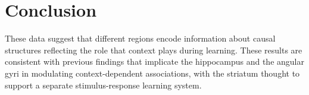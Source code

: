 \documentclass[10pt,letterpaper]{article}
\begin{document}
\section{Conclusion}

These data suggest that different regions encode information about causal structures reflecting the role that context plays during learning. These results are consistent with previous findings that implicate the hippocampus and the angular gyri in modulating context-dependent associations, with the striatum thought to support a separate stimulus-response learning system.

\nocite{ChalnickBillman1988a}
\nocite{Feigenbaum1963a}
\nocite{Hill1983a}
\nocite{OhlssonLangley1985a}
\nocite{Matlock2001}
\nocite{NewellSimon1972a}
\nocite{ShragerLangley1990a}




\setlength{\bibleftmargin}{.125in}
\setlength{\bibindent}{-\bibleftmargin}


\end{document}
